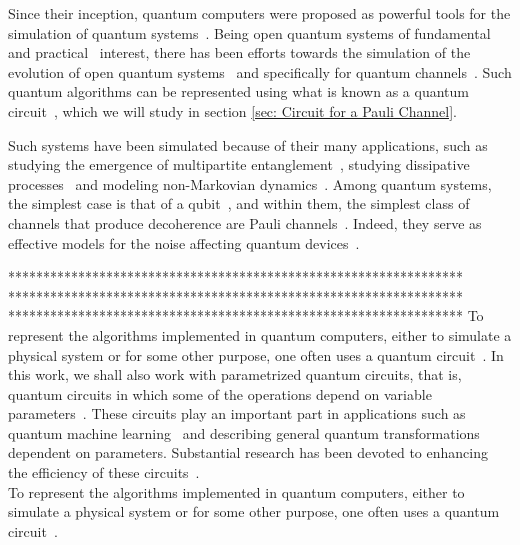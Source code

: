\documentclass[10pt,letterpaper]{article} %
\begin{document}

Since their inception, quantum computers were proposed as powerful tools for
the simulation of quantum systems~\cite{feynman1982simulating}.  Being open
quantum systems of fundamental~\cite{Zur91,RevModPhys.76.1267} and
practical~\cite{breuer2007theory} interest, there has been efforts towards the
simulation of the evolution of open quantum systems~\cite{Garcia, Wang,Weimer}
and specifically for quantum channels~\cite{Xin,Wei,Zanetti}.
Such quantum algorithms can be represented using what is known as a quantum
circuit~\cite{chuangbook}, which we will study in section \ref{sec: Circuit for a Pauli Channel}.

Such systems have been simulated because of their many applications, 
such as studying the emergence of multipartite entanglement~\cite{Andrea,Andrea_AD},
studying dissipative processes~\cite{Barreiro}
and modeling non-Markovian dynamics~\cite{Marsden}.
Among quantum systems, the simplest case is that of a qubit~\cite{chuangbook},
and within them, the simplest class of channels that produce decoherence are
Pauli channels~\cite{geometry,Zbigniew,Davalos}. Indeed, they serve as
effective models for the noise affecting quantum devices~\cite{Flammia}.



*****************************************************************
*****************************************************************
*****************************************************************
To represent the algorithms implemented in quantum computers, either to
simulate a physical system or for some other purpose, one often uses a quantum
circuit~\cite{chuangbook}.  In this work, we shall also work with parametrized
quantum circuits, that is,  quantum circuits in which some of the operations
depend on variable parameters~\cite{cerezo}.  These circuits play an important
part in applications such as quantum machine learning~\cite{Benedetti} and
describing general quantum transformations dependent on parameters. Substantial
research has been devoted to enhancing the efficiency of these
circuits~\cite{Rasmussen}.  \\



To represent the algorithms implemented in quantum computers, either to
simulate a physical system or for some other purpose, one often uses a quantum
circuit~\cite{chuangbook}.
\end{document}
